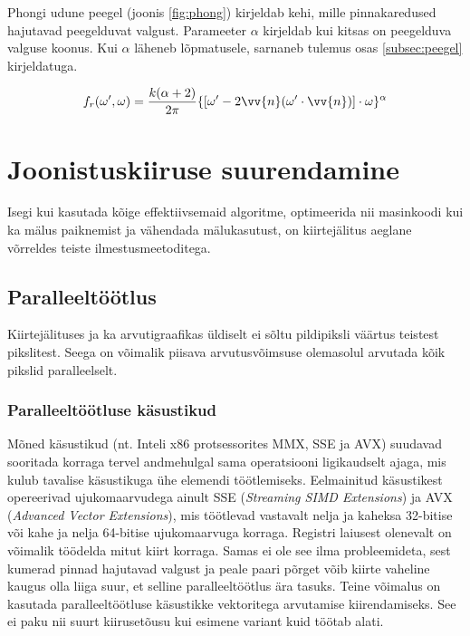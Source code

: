 \documentclass[a4paper,12pt]{report}
\renewcommand{\vec}[1]{\vv{#1}}
\begin{document}
Phongi udune peegel (joonis \ref{fig:phong}) kirjeldab kehi, mille pinnakaredused hajutavad
peegelduvat valgust. Parameeter \(\alpha\) kirjeldab kui kitsas on peegelduva
valguse koonus. Kui \(\alpha\) läheneb lõpmatusele, sarnaneb tulemus
osas \ref{subsec:peegel} kirjeldatuga.

\begin{equation}
f_r(\omega', \omega) = \frac{k(\alpha+2)}{2\pi}\{[\omega'-2\vec n(\omega'\cdot\vec n)]\cdot\omega\}^\alpha
\end{equation}

\section{Joonistuskiiruse suurendamine}
Isegi kui kasutada kõige effektiivsemaid algoritme, optimeerida nii
masinkoodi kui ka mälus paiknemist ja vähendada mälukasutust, on
kiirtejälitus aeglane võrreldes teiste ilmestusmeetoditega.

\subsection{Paralleeltöötlus}
Kiirtejälituses ja ka arvutigraafikas üldiselt ei sõltu pildipiksli
väärtus teistest pikslitest. Seega on võimalik piisava arvutusvõimsuse
olemasolul arvutada kõik pikslid paralleelselt.

\subsubsection{Paralleeltöötluse käsustikud}
Mõned käsustikud (nt. Inteli x86 protsessorites MMX, SSE ja AVX) suudavad
sooritada korraga tervel andmehulgal sama operatsiooni ligikaudselt ajaga,
mis kulub tavalise käsustikuga ühe elemendi töötlemiseks. Eelmainitud
käsustikest opereerivad uju\-koma\-arvudega ainult SSE (\textit{Streaming
SIMD Extensions}) ja AVX (\textit{Advanced Vector Extensions}), mis 
töötlevad vastavalt nelja ja kaheksa 32-bitise või kahe ja nelja 64-bitise
ujukomaarvuga korraga. Registri laiusest olenevalt on võimalik töödelda
mitut kiirt korraga. Samas ei ole see ilma probleemideta, sest kumerad
pinnad hajutavad valgust ja peale paari põrget võib kiirte vaheline kaugus
olla liiga suur, et selline paralleeltöötlus ära tasuks. Teine võimalus
on kasutada paralleeltöötluse käsustikke vektoritega arvutamise kiirendamiseks.
See ei paku nii suurt kiirusetõusu kui esimene variant kuid töötab alati.
\end{document}
